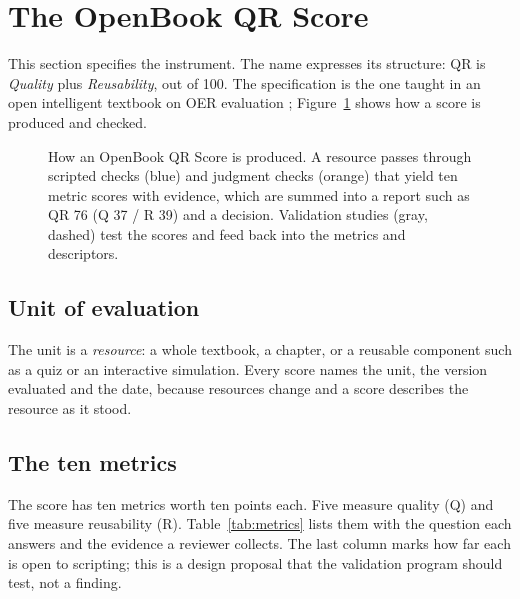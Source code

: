 \section{The OpenBook QR Score}
\label{sec:score}

This section specifies the instrument. The name expresses its structure: QR is \emph{Quality} plus \emph{Reusability}, out of 100. The specification is the one taught in an open intelligent textbook on OER evaluation \cite{oerevaluator}; Figure~\ref{fig:workflow} shows how a score is produced and checked.

\begin{figure}[htbp]
  \centering
  \resizebox{\linewidth}{!}{}
  \caption{How an OpenBook QR Score is produced. A resource passes through scripted checks (blue) and judgment checks (orange) that yield ten metric scores with evidence, which are summed into a report such as QR 76 (Q 37 / R 39) and a decision. Validation studies (gray, dashed) test the scores and feed back into the metrics and descriptors.}
  \label{fig:workflow}
\end{figure}

\subsection{Unit of evaluation}
The unit is a \emph{resource}: a whole textbook, a chapter, or a reusable component such as a quiz or an interactive simulation. Every score names the unit, the version evaluated and the date, because resources change and a score describes the resource as it stood.

\subsection{The ten metrics}
The score has ten metrics worth ten points each. Five measure quality (Q) and five measure reusability (R). Table~\ref{tab:metrics} lists them with the question each answers and the evidence a reviewer collects. The last column marks how far each is open to scripting; this is a design proposal that the validation program should test, not a finding.

